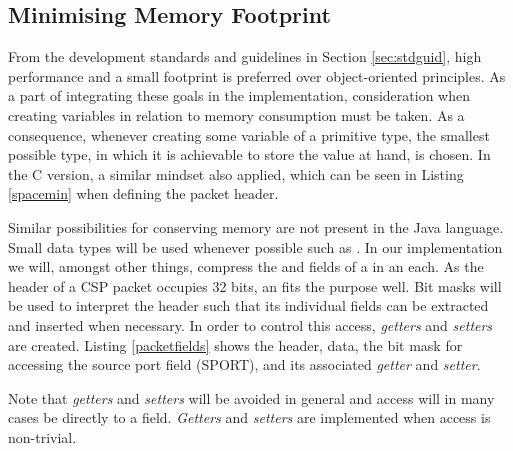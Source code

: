 \subsection{Minimising Memory Footprint} %
\label{sub:minimizing_memory_footprint}
From the development standards and guidelines in Section \ref{sec:stdguid}, high performance and a small footprint is preferred over object-oriented principles. As a part of integrating these goals in the implementation, consideration when creating variables in relation to memory consumption must be taken. As a consequence, whenever creating some variable of a primitive type, the smallest possible type, in which it is achievable to store the value at hand, is chosen. In the C version, a similar mindset also applied, which can be seen in Listing \ref{spacemin} when defining the packet header.



Similar possibilities for conserving memory are not present in the Java language. Small data types will be used whenever possible such as . In our implementation we will, amongst other things, compress the  and  fields of a  in an  each. As the header of a CSP packet occupies 32 bits, an  fits the purpose well. Bit masks will be used to interpret the header such that its individual fields can be extracted and inserted when necessary. In order to control this access, \textit{getters} and \textit{setters} are created. Listing \ref{packetfields} shows the header, data, the bit mask for accessing the source port field (SPORT), and its associated \textit{getter} and \textit{setter}.



Note that \textit{getters} and \textit{setters} will be avoided in general and access will in many cases be directly to a  field. \textit{Getters} and \textit{setters} are implemented when access is non-trivial.
